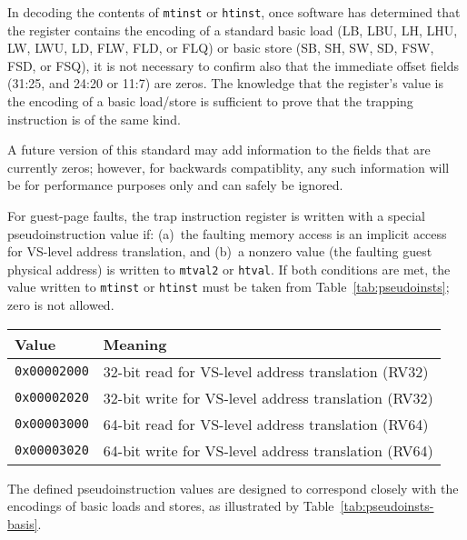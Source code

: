 \begin{commentary}
In decoding the contents of {\tt mtinst} or {\tt htinst}, once software
has determined that the register contains the encoding of a standard
basic load (LB, LBU, LH, LHU, LW, LWU, LD, FLW, FLD, or FLQ) or basic
store (SB, SH, SW, SD, FSW, FSD, or FSQ), it is not necessary to confirm
also that the immediate offset fields (31:25, and 24:20 or 11:7) are
zeros.
The knowledge that the register's value is the encoding of a basic
load/store is sufficient to prove that the trapping instruction is of the
same kind.

A future version of this standard may add information to the fields that
are currently zeros;
however, for backwards compatiblity, any such information will be for
performance purposes only and can safely be ignored.
\end{commentary}

For guest-page faults, the trap instruction register is written with a
special pseudoinstruction value if:
(a)~the faulting memory access is an implicit access for VS-level address
translation, and
(b)~a nonzero value (the faulting guest physical address) is written to
{\tt mtval2} or {\tt htval}.
If both conditions are met, the value written to {\tt mtinst} or
{\tt htinst} must be taken from Table~\ref{tab:pseudoinsts};
zero is not allowed.

\begin{table*}[h!]
\begin{center}
\begin{tabular}{|l|l|}
\hline
Value            & Meaning \\
\hline
{\tt 0x00002000} & 32-bit read for VS-level address translation (RV32) \\
{\tt 0x00002020} & 32-bit write for VS-level address translation (RV32) \\
\hline
{\tt 0x00003000} & 64-bit read for VS-level address translation (RV64) \\
{\tt 0x00003020} & 64-bit write for VS-level address translation (RV64) \\
\hline
\end{tabular}
\end{center}
\caption{Special pseudoinstruction values for guest-page faults.
The RV32 values are used when VSXLEN=32, and the RV64 values when VSXLEN=64.}
\label{tab:pseudoinsts}
\end{table*}

The defined pseudoinstruction values are designed to correspond closely
with the encodings of basic loads and stores, as illustrated by
Table~\ref{tab:pseudoinsts-basis}.

